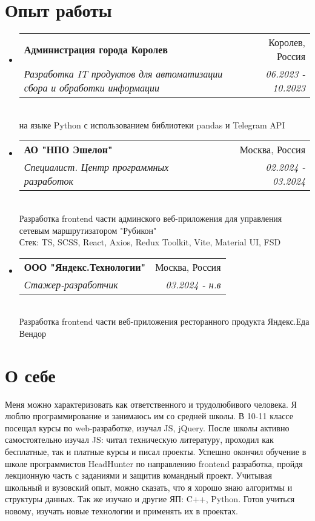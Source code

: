 \documentclass[letterpaper,10pt]{article}
\makeatletter
\newcommand{\resumeSubheading}[4]{
  \vspace{-1pt}\item
    \begin{tabular*}{0.97\textwidth}{l@{\extracolsep{\fill}}r}
      \textbf{#1} & \textcolor{mygray}{#2} \\
      \textit{\small#3} & \textcolor{mygray}{\textit{\small #4}} \\
    \end{tabular*}\vspace{-5pt}
}
\newcommand{\resumeSubHeadingListStart}{\begin{itemize}[leftmargin=*]}
\newcommand{\resumeSubHeadingListEnd}{\end{itemize}}
\makeatother
\begin{document}
\section{Опыт работы}
  \resumeSubHeadingListStart
    \resumeSubheading
       {Администрация города Королев}{Королев, Россия}
      {Разработка IT продуктов для автоматизации сбора и обработки информации }{06.2023 - 10.2023}
      \\ \vspace{4pt}
      {на языке Python с использованием библиотеки pandas и Telegram API}
      \\ \vspace{4pt}
  \resumeSubHeadingListEnd
   \resumeSubHeadingListStart
    \resumeSubheading
       {АО "НПО Эшелон"}{Москва, Россия}
      {Специалист. Центр программных разработок}{02.2024 - 03.2024}
      \\ \vspace{4pt}
      {Разработка frontend части админского веб-приложения для управления }
      \\ \vspace{0pt}
      {сетевым маршрутизатором "Рубикон"}
      \\ \vspace{1pt}
      {Стек: TS, SCSS, React, Axios, Redux Toolkit, Vite, Material UI, FSD}
      \\ \vspace{4pt}
  \resumeSubHeadingListEnd
   \resumeSubHeadingListStart
    \resumeSubheading
       {ООО "Яндекс.Технологии"}{Москва, Россия}
      {Стажер-разработчик }{03.2024 - н.в}
      \\ \vspace{4pt}
      {Разработка frontend части веб-приложения ресторанного продукта Яндекс.Еда Вендор}
      \\ \vspace{4pt}
  \resumeSubHeadingListEnd

\section{О себе}
    Меня можно характеризовать как ответственного и трудолюбивого человека. Я люблю программирование и занимаюсь им со средней школы. В 10-11 классе посещал курсы по web-разработке, изучал JS, jQuery. После школы активно самостоятельно изучал JS: читал техническую литературу, проходил как бесплатные, так и платные курсы и писал проекты. Успешно окончил обучение в школе программистов HeadHunter по направлению frontend разработка, пройдя лекционную часть с заданиями и защитив командный проект. Учитывая школьный и вузовский опыт, можно сказать, что я хорошо знаю алгоритмы и структуры данных. Так же изучаю и другие ЯП: C++, Python. Готов учиться новому, изучать новые технологии и применять их в проектах.
\end{document}
